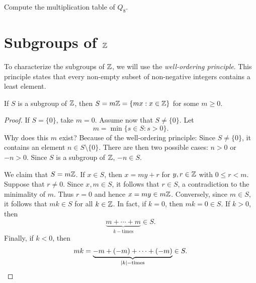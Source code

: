 \begin{exercise}
\label{xca:Q8_table}
    Compute the multiplication table of $Q_8$. 
\end{exercise}

\section{Subgroups of \texorpdfstring{$\mathbb{Z}$}{Z}}


To characterize the subgroups of $\mathbb{Z}$, we will 
use 
the \emph{well-ordering principle}. This principle states that every non-empty subset of non-negative integers contains a least element. 

\begin{theorem}
        \label{thm:Z}
        If $S$ is a subgroup of $\mathbb{Z}$, then
                $S=m\mathbb{Z}=\{mx:x\in \mathbb{Z}\}$
                for some $m\geq0$.
        \end{theorem}
        
        \begin{proof}
                If $S=\{0\}$, take $m=0$. 
                Assume now that $S\ne\{0\}$. Let 
                \[
                m=\min\{s\in S:s>0\}.
                \]
                Why does this $m$ exist? Because of the well-ordering
                principle: 
                Since $S\ne\{0\}$,  
                it contains 
                an element $n\in S\setminus\{0\}$. 
                There are then two possible cases: 
                $n>0$ or $-n>0$. Since 
                $S$ is a subgroup of $\mathbb{Z}$, $-n\in S$.
        
                We claim that $S=m\mathbb{Z}$.
                If $x\in S$, then $x=my+r$ for $y,r\in\mathbb{Z}$ with 
                $0\leq r<m$. Suppose that $r\ne 0$. Since $x,m\in S$, it follows that 
                $r\in S$,
                a contradiction to the minimality of $m$. Thus $r=0$ 
                and hence $x=my\in
                m\mathbb{Z}$. Conversely, since $m\in S$, it follows that
                 $mk\in S$ for all $k\in\mathbb{Z}$. In fact, if $k=0$, then 
                 $mk=0\in S$. If $k>0$, 
                 then 
                \[
                \underbrace{m+\cdots+m}_{k-\text{times}}\in S.
                \]
                Finally, if $k<0$, 
                then 
                \[
                mk=\underbrace{-m+(-m)+\cdots+(-m)}_{|k|-\text{times}}\in S.\qedhere
                \]
        \end{proof}


